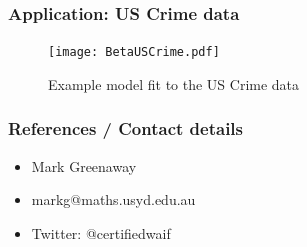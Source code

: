 \documentclass{beamer}
\begin{document}
\begin{frame}
	\frametitle{Application: US Crime data}
	\begin{figure}
		\caption{Example model fit to the US Crime data}
		\texttt{[image: BetaUSCrime.pdf]}
	\end{figure}
\end{frame}


\begin{frame}
	\frametitle{References / Contact details}
	\begin{itemize}
		\item Mark Greenaway
		\item markg@maths.usyd.edu.au
		\item Twitter: @certifiedwaif	
	\end{itemize}

	\small
	
	
\end{frame}

\end{document}
